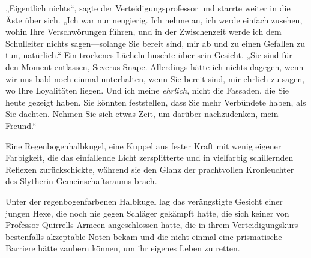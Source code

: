 „Eigentlich nichts“, sagte der Verteidigungsprofessor und starrte weiter in die Äste über sich. „Ich war nur neugierig. Ich nehme an, ich werde einfach zusehen, wohin Ihre Verschwörungen führen, und in der Zwischenzeit werde ich dem Schulleiter nichts sagen—solange Sie bereit sind, mir ab und zu einen Gefallen zu tun, natürlich.“ Ein trockenes Lächeln huschte über sein Gesicht. „Sie sind für den Moment entlassen, Severus Snape. Allerdings hätte ich nichts dagegen, wenn wir uns bald noch einmal unterhalten, wenn Sie bereit sind, mir ehrlich zu sagen, wo Ihre Loyalitäten liegen. Und ich meine \emph{ehrlich}, nicht die Fassaden, die Sie heute gezeigt haben. Sie könnten feststellen, dass Sie mehr Verbündete haben, als Sie dachten. Nehmen Sie sich etwas Zeit, um darüber nachzudenken, mein Freund.“


Eine Regenbogenhalbkugel, eine Kuppel aus fester Kraft mit wenig eigener Farbigkeit, die das einfallende Licht zersplitterte und in vielfarbig schillernden Reflexen zurückschickte, während sie den Glanz der prachtvollen Kronleuchter des Slytherin-Gemeinschaftsraums brach.

Unter der regenbogenfarbenen Halbkugel lag das verängstigte Gesicht einer jungen Hexe, die noch nie gegen Schläger gekämpft hatte, die sich keiner von Professor Quirrells Armeen angeschlossen hatte, die in ihrem Verteidigungskurs bestenfalls akzeptable Noten bekam und die nicht einmal eine prismatische Barriere hätte zaubern können, um ihr eigenes Leben zu retten.


